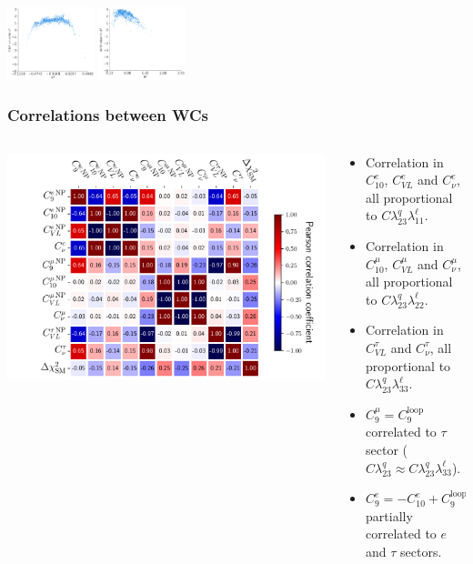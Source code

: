 \documentclass[mathserif, 10pt]{beamer}
\begin{document}
\begin{frame}
\begin{center}
        \includegraphics[width=0.19\textwidth]{figures/SHAP_aq.pdf}
        \includegraphics[width=0.19\textwidth]{figures/SHAP_bq.pdf}
    \end{center}
    

\end{frame}

\begin{frame}
    \frametitle{Correlations between WCs}

    \begin{columns}
        \begin{column}{0.5\textwidth}
            \includegraphics[width=\columnwidth]{figures/coeffcorr.pdf}
        \end{column}
        \begin{column}{0.5\textwidth}
            \begin{itemize}
                \item Correlation in $C_{10}^e$, $C_{VL}^e$ and $C_\nu^e$, all proportional to $C \lambda^q_{23} \lambda^\ell_{11}$.
                \item Correlation in $C_{10}^\mu$, $C_{VL}^\mu$ and $C_\nu^\mu$, all proportional to $C \lambda^q_{23} \lambda^\ell_{22}$.
                \item Correlation in $C_{VL}^\tau$ and $C_\nu^\tau$, all proportional to $C \lambda^q_{23} \lambda^\ell_{33}$.
                \item $C_9^\mu = C_9^\mathrm{loop}$ correlated to $\tau$ sector ($C\lambda^q_{23} \approx C\lambda^q_{23} \lambda^\ell_{33}$).
                \item $C_9^e = -C_{10}^e + C_9^\mathrm{loop}$ partially correlated to $e$ and $\tau$ sectors.
            \end{itemize}
            

\end{column}
\end{columns}
\end{frame}
\end{document}
